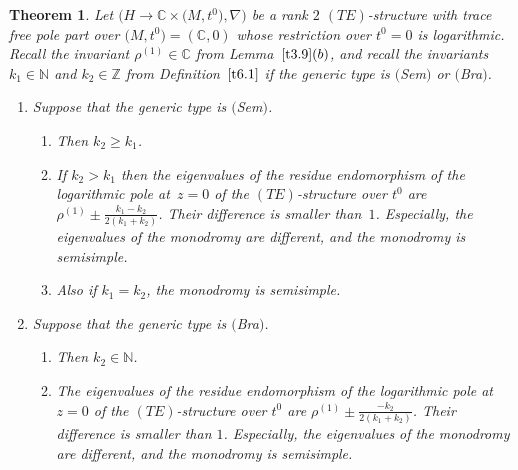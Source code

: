 \documentclass[10pt,a4paper]{amsart}
\numberwithin{equation}{section}
\numberwithin{figure}{section}
\newcommand{\N}{{\mathbb N}}
\newcommand{\Z}{{\mathbb Z}}
\newcommand{\C}{{\mathbb C}}
\newcommand{\nnn}{\nabla}
\newtheorem{Theorem}{Theorem}[section]
\begin{document}
\begin{Theorem}\label{t6.2}
Let $\big(H\to\C\times \big(M,t^0\big),\nnn\big)$ be a rank $2$ $(TE)$-structure
with trace free pole part over $\big(M,t^0\big)=(\C,0)$
whose restriction over $t^0=0$ is logarithmic.
Recall the invariant $\rho^{(1)}\in\C$ from Lemma~$\ref{t3.9}(b)$, and recall the invariants $k_1\in\N$ and $k_2\in\Z$
from Definition~$\ref{t6.1}$
if the generic type is $($Sem$)$ or $($Bra$)$.
\begin{enumerate}\itemsep=0pt
\item[$(a)$] Suppose that the generic type is $($Sem$)$.
\begin{enumerate}\itemsep=0pt
\item[$(i)$] Then $k_2\geq k_1$.

\item[$(ii)$] If $k_2>k_1$ then the eigenvalues of the
residue endomorphism of the logarithmic pole at~$z=0$
of the $(TE)$-structure over $t^0$ are
$\rho^{(1)}\pm \frac{k_1-k_2}{2(k_1+k_2)}$. Their difference
is smaller than~$1$. Especially, the eigenvalues of the
monodromy are different, and the mono\-dromy is semisimple.

\item[$(iii)$] Also if $k_1=k_2$, the monodromy is semisimple.
\end{enumerate}

\item[$(b)$] Suppose that the generic type is $($Bra$)$.
\begin{enumerate}\itemsep=0pt
\item[$(i)$] Then $k_2\in\N$.

\item[$(ii)$] The eigenvalues of the residue endomorphism of the
logarithmic pole at $z=0$ of the $(TE)$-structure over $t^0$
are $\rho^{(1)}\pm \frac{-k_2}{2(k_1+k_2)}$. Their difference
is smaller than $1$. Especially, the eigenvalues of the
monodromy are different, and the monodromy is semisimple.
\end{enumerate}
\end{enumerate}
\end{Theorem}
\end{document}
